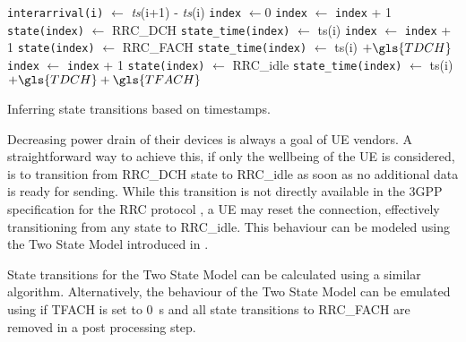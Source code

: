\begin{algorithm}
  \begin{algorithmic}
    \State \texttt{interarrival(i)} $\leftarrow$ \emph{ts}(i+1) - \emph{ts}(i)
    \State \texttt{index} $\leftarrow 0$
        \State \texttt{index} $\leftarrow$ \texttt{index} + 1
        \State \texttt{state(index)} $\leftarrow$ \gls{RRC_DCH}
        \State \texttt{state\_time(index)} $\leftarrow$ ts(i)
      \EndIf
        \State \texttt{index} $\leftarrow$ \texttt{index} + 1
        \State \texttt{state(index)} $\leftarrow$ \gls{RRC_FACH}
        \State \texttt{state\_time(index)} $\leftarrow$ ts(i) $+ \gls{TDCH}$
      \EndIf
        \State \texttt{index} $\leftarrow$ \texttt{index} + 1
        \State \texttt{state(index)} $\leftarrow$ \gls{RRC_idle}
        \State \texttt{state\_time(index)} $\leftarrow$ ts(i) $+ \gls{TDCH} + \gls{TFACH}$
      \EndIf
    \EndFor
  \end{algorithmic}
  \caption{Inferring  state transitions based on  timestamps.}
  \label{alg:network:network_traces:performance_evaluation:inferring_network_state:inference_algorithm}
\end{algorithm}

Decreasing power drain of their devices is always a goal of \gls{UE} vendors.
A straightforward way to achieve this, if only the wellbeing of the \gls{UE} is considered, is to transition from \gls{RRC_DCH} state to \gls{RRC_idle} as soon as no additional data is ready for sending.
While this transition is not directly available in the 3GPP specification for the \gls{RRC} protocol \cite{3GPP_RRC_Spec}, a \gls{UE} may reset the connection, effectively transitioning from any state to \gls{RRC_idle}.
This behaviour can be modeled using the Two State Model introduced in .

State transitions for the Two State Model can be calculated using a similar algorithm.
Alternatively, the behaviour of the Two State Model can be emulated using  if \gls{TFACH} is set to \SI{0}{\second} and all state transitions to \gls{RRC_FACH} are removed in a post processing step.

